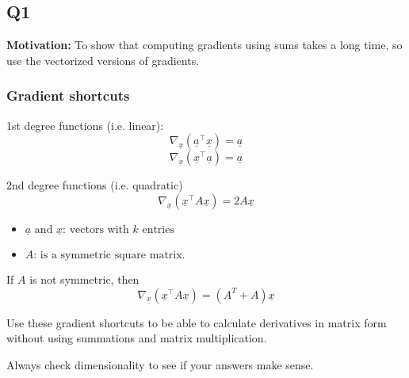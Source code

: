 \subsection{Q1}
\textbf{Motivation:} To show that computing gradients using sums takes a long time, so use the vectorized versions of gradients. 
\subsubsection{Gradient shortcuts}
\begin{definition}
    1st degree functions (i.e. linear):
    \begin{equation}
        \nabla_{\underline{x}} (\underline{a}^\top \underline{x}) = \underline{a}
    \end{equation}
    \begin{equation}
        \nabla_{\underline{x}} (\underline{x}^\top \underline{a}) = \underline{a} 
    \end{equation}
    
    2nd degree functions (i.e. quadratic)
    \begin{equation}
        \nabla_{\underline{x}} (\underline{x}^\top A \underline{x}) = 2A\underline{x}
    \end{equation}
    \begin{itemize}
        \item $\underline{a} \text{ and } \underline{x} \text{: vectors with } k \text{ entries}$
        \item $A \text{: is a symmetric square matrix}.$
    \end{itemize}
    \vspace{1em}

    If $A$ is not symmetric, then 
    \begin{equation}
        \nabla_{\underline{x}} (\underline{x}^\top A \underline{x}) = (A^T + A)\underline{x}
    \end{equation}
\end{definition}

\begin{intuition}
    Use these gradient shortcuts to be able to calculate derivatives in matrix form without using summations and matrix multiplication. 
\end{intuition}

\begin{warning}
    Always check dimensionality to see if your answers make sense.
\end{warning}

